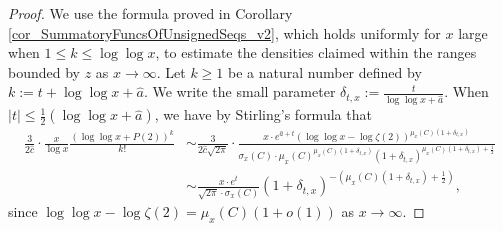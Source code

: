 \documentclass[11pt,reqno,a4letter]{article}
\numberwithin{figure}{section}
\numberwithin{table}{section}
\theoremstyle{plain}
\numberwithin{theorem}{section}
\theoremstyle{definition}
\begin{document}
\begin{proof}
We use the formula proved in Corollary \ref{cor_SummatoryFuncsOfUnsignedSeqs_v2}, 
which holds uniformly for $x$ large when $1 \leq k \leq \log\log x$, to estimate the 
densities claimed within the ranges bounded by $z$ as $x \rightarrow \infty$. 
Let $k \geq 1$ be a natural number defined by $k := t + \log\log x + \hat{a}$. 
We write the small parameter $\delta_{t,x} := \frac{t}{\log\log x + \hat{a}}$. 
When $|t| \leq \frac{1}{2} (\log\log x + \hat{a})$, we have by Stirling's formula that 
\begin{align*} 
\frac{3}{2\hat{c}} \cdot \frac{x}{\log x} \frac{(\log\log x + P(2))^{k}}{k!} & \sim 
     \frac{3}{2\hat{c} \sqrt{2\pi}} \cdot \frac{x \cdot e^{\hat{a} + t} 
     (\log\log x - \log\zeta(2))^{\mu_x(C)(1+\delta_{t,x})}}{ 
     \sigma_x(C) \cdot \mu_x(C)^{\mu_x(C) (1 + \delta_{t,x})}
     (1 + \delta_{t,x})^{\mu_x(C) (1 + \delta_{t,x}) + \frac{1}{2}}} \\ 
     & \sim \frac{x \cdot e^{t}}{\sqrt{2\pi} \cdot \sigma_x(C)} (1 + \delta_{t,x})^{-\left( 
     \mu_x(C) (1 + \delta_{t,x}) + \frac{1}{2}\right)}, 
\end{align*} 
since $\log\log x - \log\zeta(2) = \mu_x(C) (1 + o(1))$ as $x \rightarrow \infty$. 


\end{proof}
\end{document}

